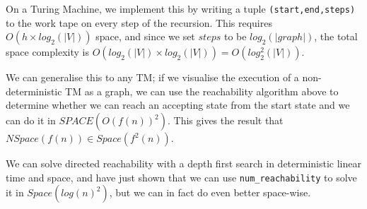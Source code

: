 On a Turing Machine, we implement this by writing a tuple
\texttt{(start,end,steps)} to the work tape on every step of the recursion. This
requires $O(h \times log_2(|V|))$ space, and since we set $steps$ to be $log_2
(|graph|)$, the total space complexity is $O(log_2(|V|) \times log_2(|V|)) = O(
log^2_2(|V|))$.

We can generalise this to any TM; if we visualise the execution of a non-
deterministic TM as a graph, we can use the reachability algorithm above to
determine whether we can reach an accepting state from the start state and we
can do it in $SPACE(O(f(n))^2)$. This gives the result that $NSpace(f(n)) \in
Space(f^2(n))$.

We can solve directed reachability with a depth first search in deterministic
linear time and space, and have just shown that we can use
\texttt{num\_reachability} to solve it in $Space(log(n)^2)$, but we can in fact
do even better space-wise.
